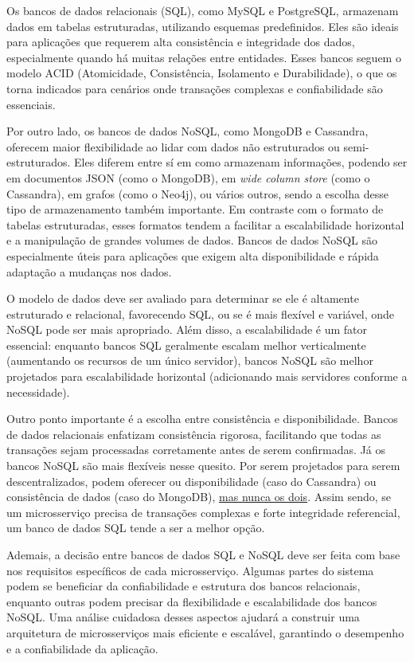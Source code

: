 Os bancos de dados relacionais (SQL), como MySQL e PostgreSQL, armazenam dados em tabelas estruturadas, utilizando esquemas predefinidos. Eles são ideais para aplicações que requerem alta consistência e integridade dos dados, especialmente quando há muitas relações entre entidades. Esses bancos seguem o modelo ACID (Atomicidade, Consistência, Isolamento e Durabilidade), o que os torna indicados para cenários onde transações complexas e confiabilidade são essenciais. \cite{mongodb-sql-nosql}

Por outro lado, os bancos de dados NoSQL, como MongoDB e Cassandra, oferecem maior flexibilidade ao lidar com dados não estruturados ou semi-estruturados. Eles diferem entre sí em como armazenam informações, podendo ser em documentos JSON (como o MongoDB), em \emph{wide column store} (como o Cassandra), em grafos (como o Neo4j), ou vários outros, sendo a escolha desse tipo de armazenamento também importante. Em contraste com o formato de tabelas estruturadas, esses formatos tendem a facilitar a escalabilidade horizontal e a manipulação de grandes volumes de dados. Bancos de dados NoSQL são especialmente úteis para aplicações que exigem alta disponibilidade e rápida adaptação a mudanças nos dados. \cite{mongodb-sql-nosql}

O modelo de dados deve ser avaliado para determinar se ele é altamente estruturado e relacional, favorecendo SQL, ou se é mais flexível e variável, onde NoSQL pode ser mais apropriado. Além disso, a escalabilidade é um fator essencial: enquanto bancos SQL geralmente escalam melhor verticalmente (aumentando os recursos de um único servidor), bancos NoSQL são melhor projetados para escalabilidade horizontal (adicionando mais servidores conforme a necessidade). \cite{mongodb-sql-nosql}

Outro ponto importante é a escolha entre consistência e disponibilidade. Bancos de dados relacionais enfatizam consistência rigorosa, facilitando que todas as transações sejam processadas corretamente antes de serem confirmadas. Já os bancos NoSQL são mais flexíveis nesse quesito. Por serem projetados para serem descentralizados, podem oferecer ou disponibilidade (caso do Cassandra) ou consistência de dados (caso do MongoDB), \hyperref[teorema-cap]{mas nunca os dois}. Assim sendo, se um microsserviço precisa de transações complexas e forte integridade referencial, um banco de dados SQL tende a ser a melhor opção. \cite{ibm-choosing-database,mongodb-sql-nosql}

Ademais, a decisão entre bancos de dados SQL e NoSQL deve ser feita com base nos requisitos específicos de cada microsserviço. Algumas partes do sistema podem se beneficiar da confiabilidade e estrutura dos bancos relacionais, enquanto outras podem precisar da flexibilidade e escalabilidade dos bancos NoSQL. Uma análise cuidadosa desses aspectos ajudará a construir uma arquitetura de microsserviços mais eficiente e escalável, garantindo o desempenho e a confiabilidade da aplicação.

